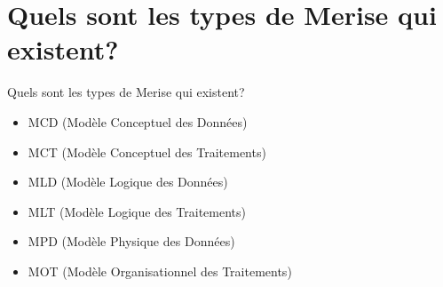 \documentclass{beamer}
\begin{document}
\section{Quels sont les types de Merise qui existent?}
\begin{frame}{Quels sont les types de Merise qui existent?}
\begin{itemize}
  \item MCD (Modèle Conceptuel des Données)
  \item MCT (Modèle Conceptuel des Traitements)
  \item MLD (Modèle Logique des Données)
  \item MLT (Modèle Logique des Traitements)
  \item MPD (Modèle Physique des Données)
  \item MOT (Modèle Organisationnel des Traitements)
\end{itemize}
\vskip 5cm
\end{frame}
\end{document}
